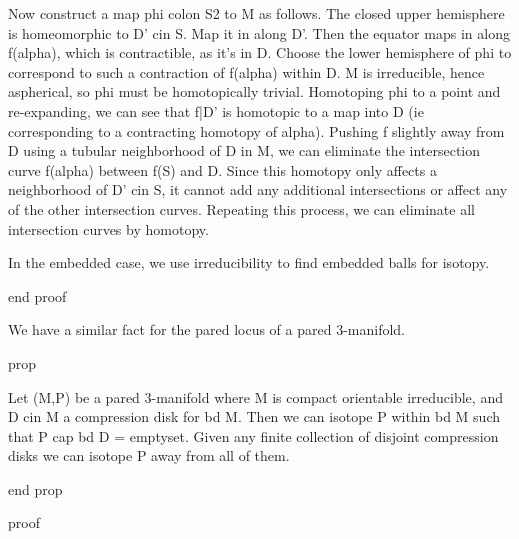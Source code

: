 Now construct a map phi colon S2 to M as follows. The closed upper hemisphere
is homeomorphic to D' cin S. Map it in along D'. Then the equator maps in along
f(alpha), which is contractible, as it's in D. Choose the lower hemisphere of
phi to correspond to such a contraction of f(alpha) within D. M is irreducible,
hence aspherical, so phi must be homotopically trivial. Homotoping phi to
a point and re-expanding, we can see that f|D' is homotopic to a map into D (ie
corresponding to a contracting homotopy of alpha). Pushing f slightly away from
D using a tubular neighborhood of D in M, we can eliminate the intersection
curve f(alpha) between f(S) and D. Since this homotopy only affects
a neighborhood of D' cin S, it cannot add any additional intersections or
affect any of the other intersection curves. Repeating this process, we can
eliminate all intersection curves by homotopy.

In the embedded case, we use irreducibility to find embedded balls for isotopy. 

end proof

We have a similar fact for the pared locus of a pared 3-manifold.

prop

Let (M,P) be a pared 3-manifold where M is compact orientable irreducible, and
D cin M a compression disk for bd M. Then we can isotope P within bd M such
that P cap bd D = emptyset. Given any finite collection of disjoint compression
disks we can isotope P away from all of them.

end prop

proof



